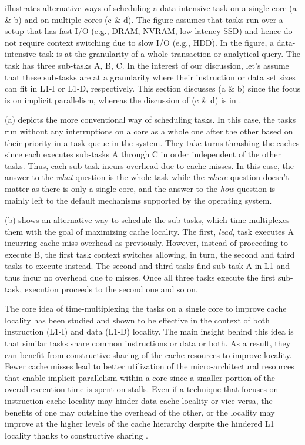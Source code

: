 \documentclass[11pt]{article}
\begin{document}
 illustrates alternative ways of scheduling a data-intensive task
on a single core (a \& b) and on multiple cores (c \& d).
The figure assumes that tasks run over a setup that has fast I/O (e.g., DRAM, NVRAM, low-latency SSD)
and hence do not require context switching due to slow I/O (e.g., HDD).
In the figure, a data-intensive task is at the granularity of a whole transaction or analytical query.
The task has three sub-tasks A, B, C.
In the interest of our discussion, let's assume that these sub-tasks are at a granularity
where their instruction or data set sizes can fit in L1-I or L1-D, respectively.
This section discusses (a \& b) since the focus is on implicit parallelism,
whereas the discussion of (c \& d) is in .

(a) depicts the more conventional way of scheduling tasks.
In this case, the tasks run without any interruptions on a core as a whole one after the other
based on their priority in a task queue in the system.
They take turns thrashing the caches since each executes sub-tasks A through
C in order independent of the other tasks.
Thus, each sub-task incurs overhead due to cache misses.
In this case,
the answer to the \textit{what} question is the whole task
while the \textit{where} question doesn't matter as there is only a single core,
and the answer to the \textit{how} question is mainly left to the default mechanisms
supported by the operating system.

(b) shows an alternative way to schedule the sub-tasks,
which time-multiplexes them with the goal of maximizing cache locality.
The first, \textit{lead}, task executes A incurring cache miss overhead as previously.
However, instead of proceeding to execute B, the first task context switches allowing,
in turn, the second and third tasks to execute instead.
The second and third tasks find sub-task A in L1 and thus incur no overhead due to misses.
Once all three tasks execute the first sub-task, execution proceeds to the second one and so on.

The core idea of time-multiplexing the tasks on a single core to improve cache locality
has been studied and shown to be effective in the context of both
instruction (L1-I) and data (L1-D) \cite{AttaTTAM13, HarizopoulosA04, HarizopoulosSA05, LarusP02} locality.
The main insight behind this idea is that similar tasks share common instructions or data or both.
As a result, they can benefit from constructive sharing of the cache resources to improve locality.
Fewer cache misses lead to better utilization of the micro-architectural resources
that enable implicit parallelism within a core
since a smaller portion of the overall execution time is spent on stalls. 
Even if a technique that focuses on instruction cache locality may hinder data cache locality or vice-versa,
the benefits of one may outshine the overhead of the other,
or the locality may improve at the higher levels of the cache hierarchy
despite the hindered L1 locality thanks to constructive sharing \cite{TozunAAM14}.
\end{document}
